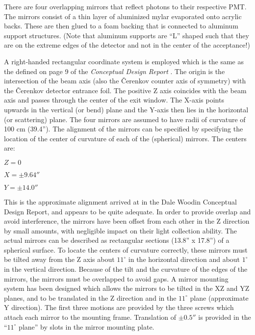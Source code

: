 \begin{obsolete}
	There are four overlapping mirrors that reflect photons to their
respective PMT.  The mirrors consist of a thin layer of aluminized mylar
evaporated onto acrylic backs.  These are then glued to a foam backing
that is connected to aluminum support structures.  (Note that aluminum
supports are ``L'' shaped such that they are on the extreme edges of the
detector and not in the center of the acceptance!)

	A right-handed rectangular coordinate system is employed which
is the same as the defined on page 9 of the {\em Conceptual Design
Report} \cite{bi:Woodin} .  The origin is the intersection of the beam
axis (also the \v{C}erenkov counter axis of symmetry) with the
\v{C}erenkov detector entrance foil.  The positive Z axis coincides
with the beam axis and passes through the center of the exit window.
The X-axis points upwards in the vertical (or bend) plane and the
Y-axis then lies in the horizontal (or scattering) plane.  The four
mirrors are assumed to have radii of curvature of 100 cm (39.4'').
The alignment of the mirrors can be specified by specifying the
location of the center of curvature of each of the (spherical)
mirrors.  The centers are:


$Z=0$

$X=\pm9.64''$

$Y=\pm14.0''$


	This is the approximate alignment arrived at in the Dale
Woodin Conceptual Design Report, and appears to be quite adequate.  In
order to provide overlap and avoid interference, the mirrors have been
offset from each other in the Z direction by small amounts, with
negligible impact on their light collection ability.  The actual
mirrors can be described as rectangular sections (13.8'' x 17.8'') of
a spherical surface.  To locate the centers of curvature correctly,
these mirrors must be tilted away from the Z axis about $11^{\circ}$
in the horizontal direction and about $1^{\circ}$ in the vertical
direction.  Because of the tilt and the curvature of the edges of the
mirrors, the mirrors must be overlapped to avoid gaps.  A mirror
mounting system has been designed which allows the mirrors to be tilted
in the XZ and YZ planes, and to be translated in the Z direction and
in the $11^{\circ}$ plane (approximate Y direction).  The first three
motions are provided by the three screws which attach each mirror to
the mounting frame.  Translation of $\pm0.5''$ is provided in the
``$11^{\circ}$ plane'' by slots in the mirror mounting plate.


\end{obsolete}
